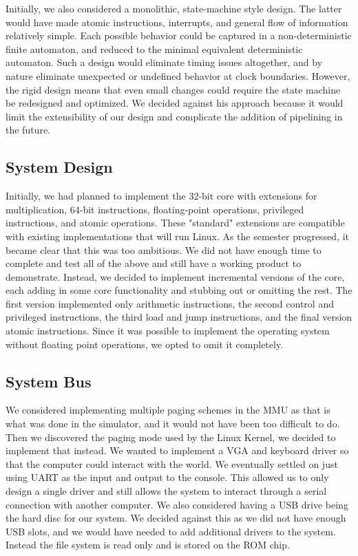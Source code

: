 \documentclass{article}
\begin{document}
Initially, we also considered a monolithic, state-machine style design.  The latter would have made atomic instructions, interrupts, and general flow of information relatively simple.  Each possible behavior could be captured in a non-deterministic finite automaton, and reduced to the minimal equivalent deterministic automaton.  Such a design would eliminate timing issues altogether, and by nature eliminate unexpected or undefined behavior at clock boundaries.  However, the rigid design means that even small changes could require the state machine be redesigned and optimized.  We decided against his approach because it would limit the extensibility of our design and complicate the addition of pipelining in the future.

\subsection{System Design}
Initially, we had planned to implement the 32-bit core with extensions for multiplication, 64-bit instructions, floating-point operations, privileged instructions, and atomic operations.  These "standard" extensions are compatible with existing implementations that will run Linux.  As the semester progressed, it became clear that this was too ambitious.  We did not have enough time to complete and test all of the above and still have a working product to demonstrate.  Instead, we decided to implement incremental versions of the core, each adding in some core functionality and stubbing out or omitting the rest.  The first version implemented only arithmetic instructions, the second control and privileged instructions, the third load and jump instructions, and the final version atomic instructions.  Since it was possible to implement the operating system without floating point operations, we opted to omit it completely.

\subsection{System Bus}
We considered implementing multiple paging schemes in the MMU as that is what was done in the simulator, and it would not have been too difficult to do. Then we discovered the paging mode used by the Linux Kernel, we decided to implement that instead. We wanted to implement a VGA and keyboard driver so that the computer could interact with the world. We eventually settled on just using UART as the input and output to the console. This allowed us to only design a single driver and still allows the system to interact through a serial connection with another computer. We also considered having a USB drive being the hard disc for our system. We decided against this as we did not have enough USB slots, and we would have needed to add additional drivers to the system. Instead the file system is read only and is stored on the ROM chip.
\end{document}
